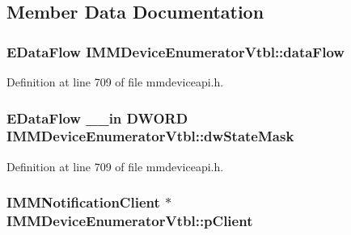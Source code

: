 \subsection{Member Data Documentation}
\subsubsection[{\texorpdfstring{data\+Flow}{dataFlow}}]{ {\bf E\+Data\+Flow} I\+M\+M\+Device\+Enumerator\+Vtbl\+::data\+Flow}\hypertarget{struct_i_m_m_device_enumerator_vtbl_ae3b70ced63e9c157c5e286176ceb4b19}{}\label{struct_i_m_m_device_enumerator_vtbl_ae3b70ced63e9c157c5e286176ceb4b19}


Definition at line 709 of file mmdeviceapi.\+h.

\subsubsection[{\texorpdfstring{dw\+State\+Mask}{dwStateMask}}]{ {\bf E\+Data\+Flow} {\bf \+\_\+\+\_\+in} {\bf D\+W\+O\+RD} I\+M\+M\+Device\+Enumerator\+Vtbl\+::dw\+State\+Mask}\hypertarget{struct_i_m_m_device_enumerator_vtbl_a75a2b8ad637ac7cf44f2d73b89f800e0}{}\label{struct_i_m_m_device_enumerator_vtbl_a75a2b8ad637ac7cf44f2d73b89f800e0}


Definition at line 709 of file mmdeviceapi.\+h.

\subsubsection[{\texorpdfstring{p\+Client}{pClient}}]{ {\bf I\+M\+M\+Notification\+Client} $\ast$ I\+M\+M\+Device\+Enumerator\+Vtbl\+::p\+Client}\hypertarget{struct_i_m_m_device_enumerator_vtbl_affdeb6da598e87d467cb1beca9c92f09}{}\label{struct_i_m_m_device_enumerator_vtbl_affdeb6da598e87d467cb1beca9c92f09}



